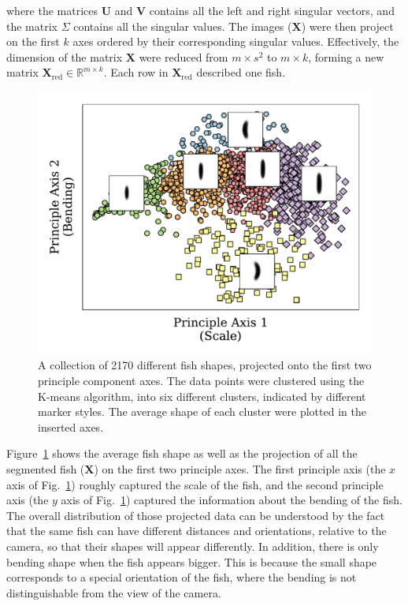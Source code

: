 \documentclass[11pt,twoside]{report}
\begin{document}
\noindent where the matrices $\mathbf{U}$ and $\mathbf{V}$ contains all the left and right singular vectors, and the matrix $\Sigma$ contains all the singular values. The images ($\mathbf{X}$) were then project on the first $k$ axes ordered by their corresponding singular values. Effectively, the dimension of the matrix $\mathbf{X}$ were reduced from $m \times s^2$ to $m \times k$, forming a new matrix $\mathbf{X}_\text{red} \in \mathbb{R}^{m \times k}$. Each row in $\mathbf{X}_\text{red}$ described one fish.


\begin{figure}
  \includegraphics[width=\linewidth]{fish-pca-proj}
  \caption{
  	A collection of 2170 different fish shapes, projected onto the first two principle component axes. The data points were clustered using the K-means algorithm, into six different clusters, indicated by different marker styles. The average shape of each cluster were plotted in the inserted axes.
  }
  \label{fig:fish_pca}
\end{figure}


Figure~\ref{fig:fish_pca} shows the average fish shape as well as the projection of all the segmented fish ($\mathbf{X}$) on the first two principle axes. The first principle axis (the $x$ axis of Fig.~\ref{fig:fish_pca}) roughly captured the scale of the fish, and the second principle axis (the $y$ axis of Fig.~\ref{fig:fish_pca}) captured the information about the bending of the fish. 
The overall distribution of those projected data can be understood by the fact that the same fish can have different distances and orientations, relative to the camera, so that their shapes will appear differently.
In addition, there is only bending shape when the fish appears bigger. This is because the small shape corresponds to a special orientation of the fish, where the bending is not distinguishable from the view of the camera.
\end{document}
